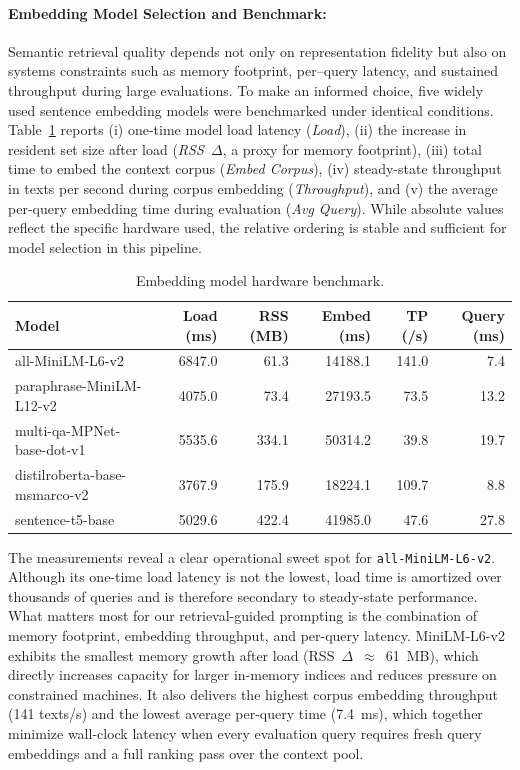 \paragraph{Embedding Model Selection and Benchmark:}
Semantic retrieval quality depends not only on representation fidelity but also on systems constraints such as memory footprint, per--query latency, and sustained throughput during large evaluations. To make an informed choice, five widely used sentence embedding models were benchmarked under identical conditions. Table~\ref{tab:embed-bench} reports (i) one-time model load latency (\emph{Load}), (ii) the increase in resident set size after load (\emph{RSS~$\Delta$}, a proxy for memory footprint), (iii) total time to embed the context corpus (\emph{Embed Corpus}), (iv) steady-state throughput in texts per second during corpus embedding (\emph{Throughput}), and (v) the average per-query embedding time during evaluation (\emph{Avg Query}). While absolute values reflect the specific hardware used, the relative ordering is stable and sufficient for model selection in this pipeline.

\begin{table}[H]
  \centering
  \caption{Embedding model hardware benchmark.}
  \label{tab:embed-bench}
  \small
  \begin{tabular}{@{}lrrrrr@{}}
    \toprule
    \textbf{Model} & \textbf{Load (ms)} & \textbf{RSS (MB)} & \textbf{Embed (ms)} & \textbf{TP (/s)} & \textbf{Query (ms)} \\
    \midrule
    all-MiniLM-L6-v2              & 6847.0  &  61.3 & 14188.1 & 141.0 &  7.4 \\
    paraphrase-MiniLM-L12-v2      & 4075.0  &  73.4 & 27193.5 &  73.5 & 13.2 \\
    multi-qa-MPNet-base-dot-v1    & 5535.6  & 334.1 & 50314.2 &  39.8 & 19.7 \\
    distilroberta-base-msmarco-v2 & 3767.9  & 175.9 & 18224.1 & 109.7 &  8.8 \\
    sentence-t5-base              & 5029.6  & 422.4 & 41985.0 &  47.6 & 27.8 \\
    \bottomrule
  \end{tabular}
\end{table}

The measurements reveal a clear operational sweet spot for \texttt{all-MiniLM-L6-v2}. Although its one-time load latency is not the lowest, load time is amortized over thousands of queries and is therefore secondary to steady-state performance. What matters most for our retrieval-guided prompting is the combination of memory footprint, embedding throughput, and per-query latency. MiniLM-L6-v2 exhibits the smallest memory growth after load (RSS~$\Delta$~$\approx$~61~MB), which directly increases capacity for larger in-memory indices and reduces pressure on constrained machines. It also delivers the highest corpus embedding throughput (141 texts/s) and the lowest average per-query time (7.4~ms), which together minimize wall-clock latency when every evaluation query requires fresh query embeddings and a full ranking pass over the context pool.

